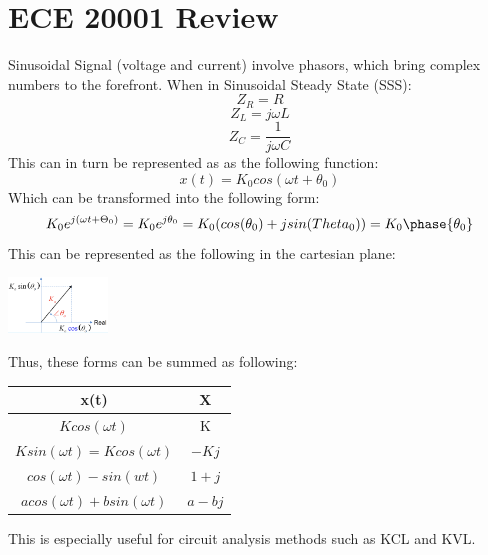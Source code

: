 \documentclass[nobib]{tufte-handout}
\begin{document}
\section{ECE 20001 Review}
Sinusoidal Signal (voltage and current) involve phasors, which bring complex numbers to the forefront. When in Sinusoidal Steady State (SSS):\\
\begin{equation*}
    Z_R=R
\end{equation*}
\begin{equation*}
    Z_L=j\omega L
\end{equation*}
\begin{equation*}
    Z_C=\frac{1}{j\omega C}
\end{equation*}
This can in turn be represented as as the following function:\\
\begin{equation*}
    x(t)=K_0 cos(\omega t + \theta_0)
\end{equation*}
Which can be transformed into the following form:\\
\begin{equation*}
    K_0 e^{j(\omega t + \Theta_0)} = K_0 e^{j \theta_0} = K_0 (cos(\theta_0) + j sin(Theta_0)) = K_0\phase{\theta_0}
\end{equation*}
This can be represented as the following in the cartesian plane:\\
\begin{center}
    \includegraphics[width = 100px]{images/Screenshot 2024-01-08 155954.png}
\end{center}
Thus, these forms can be summed as following:\\
\begin{table}
 \centering
    \begin{tabular}{c|c}
    x(t) & $\mathbf{X}$\\
    \hline
    $K cos(\omega t)$ & K\\
    $K sin(\omega t) = K cos(\omega t)$ & $-Kj$\\
    $cos(\omega t) - sin(wt)$ & $1+j$\\
    $a cos(\omega t) + b sin(\omega t)$ & $a-bj$
    \end{tabular}
\end{table}
This is especially useful for circuit analysis methods such as KCL and KVL.
\end{document}
